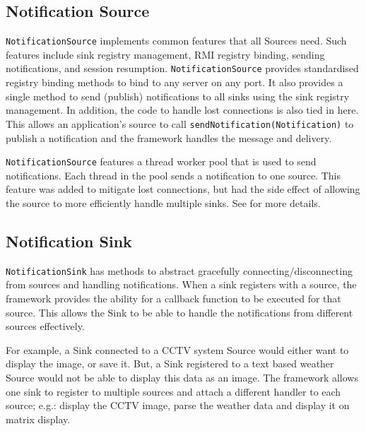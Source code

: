 \documentclass[a4paper]{article}
\begin{document}
\subsection{Notification Source}
\texttt{NotificationSource} implements common features that all Sources need.
Such features include sink registry management, RMI registry binding, sending notifications, and session resumption.
\texttt{NotificationSource} provides standardised registry binding methods to bind to any server on any port.
It also provides a single method to send (publish) notifications to all sinks using the sink registry management.
In addition, the code to handle lost connections is also tied in here.
This allows an application's source to call \texttt{sendNotification(Notification)} to publish a notification and the framework handles the message and delivery.

\texttt{NotificationSource} features a thread worker pool that is used to send notifications.
Each thread in the pool sends a notification to one source.
This feature was added to mitigate lost connections, but had the side effect of allowing the source to more efficiently handle multiple sinks.
See  for more details.

\subsection{Notification Sink}
\texttt{NotificationSink} has methods to abstract gracefully connecting/disconnecting from sources and handling notifications.
When a sink registers with a source, the framework provides the ability for a callback function to be executed for that source.
This allows the Sink to be able to handle the notifications from different sources effectively.

For example, a Sink connected to a CCTV system Source would either want to display the image, or save it.
But, a Sink registered to a text based weather Source would not be able to display this data as an image.
The framework allows one sink to register to multiple sources and attach a different handler to each source;
e.g.: display the CCTV image, parse the weather data and display it on matrix display.

\end{document}
